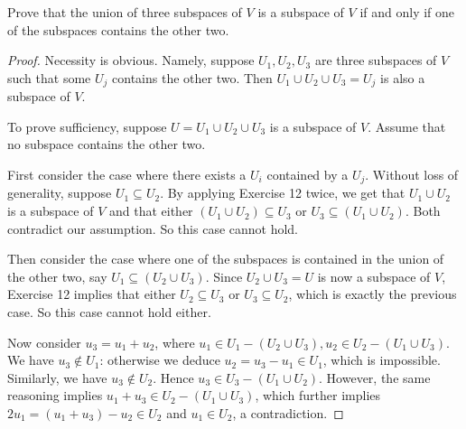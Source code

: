 \begin{exercise}{13}
	Prove that the union of three subspaces of \( V \) is a subspace of \( V \) if and only if one of the subspaces contains the other two.

\end{exercise}

\begin{proof}
	Necessity is obvious. Namely, suppose \( U_{1}, U_{2}, U_{3} \) are three subspaces of \( V \) such that some \( U_{j} \) contains the other two. Then \( U_{1} \cup U_{2} \cup U_{3} = U_{j} \) is also a subspace of \( V \).

	To prove sufficiency, suppose \( U = U_{1} \cup U_{2} \cup U_{3} \) is a subspace of \( V \). Assume that no subspace contains the other two.

	First consider the case where there exists a \( U_{i} \) contained by a \( U_{j} \). Without loss of generality, suppose \( U_{1} \subseteq U_{2} \). By applying Exercise 12 twice, we get that \( U_{1} \cup U_{2} \) is a subspace of \( V \) and that either \( (U_{1} \cup U_{2}) \subseteq U_{3} \) or \( U_{3} \subseteq (U_{1} \cup U_{2}) \). Both contradict our assumption. So this case cannot hold.

	Then consider the case where one of the subspaces is contained in the union of the other two, say \( U_{1} \subseteq (U_{2} \cup U_{3}) \). Since \( U_{2} \cup U_{3} = U \) is now a subspace of \( V \), Exercise 12 implies that either \( U_{2} \subseteq U_{3} \) or \( U_{3} \subseteq U_{2} \), which is exactly the previous case. So this case cannot hold either.

	Now consider \( u_{3} = u_{1} + u_{2} \), where \( u_{1} \in U_{1} - (U_{2} \cup U_{3}), u_{2} \in U_{2} - (U_{1} \cup U_{3}) \). We have \( u_{3} \not\in U_{1} \): otherwise we deduce \( u_{2} = u_{3} - u_{1} \in U_{1} \), which is impossible. Similarly, we have \( u_{3} \not\in U_{2} \). Hence \( u_{3} \in U_{3} - (U_{1} \cup U_{2}) \). However, the same reasoning implies \( u_{1} + u_{3} \in U_{2} - (U_{1} \cup U_{3}) \), which further implies \( 2u_{1} = (u_{1} + u_{3}) - u_{2} \in U_{2} \) and \( u_{1} \in U_{2} \), a contradiction.
\end{proof}

